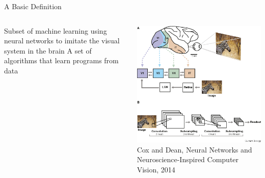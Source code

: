 
\begin{frame}{A Basic Definition}
   \begin{columns}
      \centering
      \begin{column}{0.4\linewidth}
         \begin{baseitemize}
            \itemR Subset of machine learning using neural networks to imitate the visual system in the brain
            \vspace{0.45in}
            \itemR A set of algorithms that learn programs from data
         \end{baseitemize}
      \end{column}
      \begin{column}{0.6\linewidth}
         \centering
            \includegraphics[width=0.8\columnwidth]{images/visual-nn.png}\\
            \tiny{Cox and Dean, Neural Networks and Neuroscience-Inspired Computer Vision, 2014}
      \end{column}
   \end{columns}
\end{frame}


